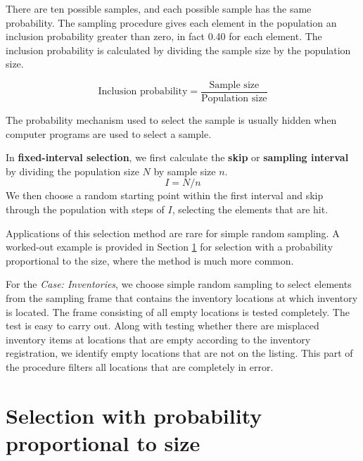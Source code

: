 \documentclass[12pt,a4paper]{memoir}
\begin{document}
There are ten possible samples, and each possible sample has the same probability. The sampling procedure gives each element in the population an inclusion probability greater than zero, in fact 0.40 for each element. The inclusion probability is calculated by dividing the sample size by the population size.

\begin{equation}
\text{Inclusion probability} = \frac{\text{Sample size}}{\text{Population size}}
\end{equation}

The probability mechanism used to select the sample is usually hidden when computer programs are used to select a sample. 

\bigskip
In \textbf{fixed-interval selection}, we first calculate the \textbf{skip} or \textbf{sampling interval} by dividing the population size $N$ by sample size $n$.
\begin{equation}
I = N / n
\end{equation}
We then choose a random starting point within the first interval and skip through the population with steps of $I$, selecting the elements that are hit. 

Applications of this selection method are rare for simple random sampling. A worked-out example is provided in Section \ref{sub:selection_with_probability_proportional_to_size} for selection with a probability proportional to the size, where the method is much more common.

\bigskip
For the \emph{Case: Inventories}, we choose simple random sampling to select elements from the sampling frame that contains the inventory locations at which inventory is located. The frame consisting of all empty locations is tested completely. The test is easy to carry out. Along with testing whether there are misplaced inventory items at locations that are empty according to the inventory registration, we identify empty locations that are not on the listing. This part of the procedure filters all locations that are completely in error. 


\section{Selection with probability proportional to size} %
\label{sub:selection_with_probability_proportional_to_size}
\end{document}
